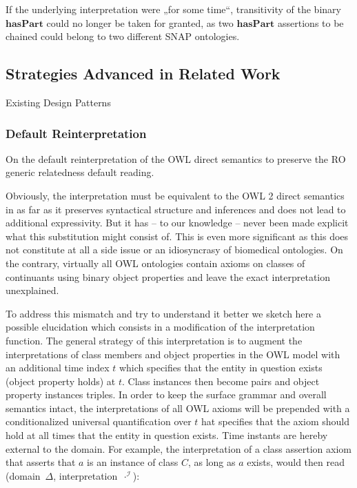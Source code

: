 \documentclass[10pt]{bmc_article}
\newcommand{\mirel}[1]{\ensuremath{\mathrm{\mathbf{#1}}}}
\newcommand{\mclass}[1]{\ensuremath{\mathit{#1}}}
\newenvironment{bmcformat}{\baselineskip20pt\sloppy\setboolean{publ}{false}}{\baselineskip20pt\sloppy}
\begin{document}
\begin{bmcformat}
If the underlying interpretation were „for some time“, transitivity of the
binary \mirel{hasPart} could no longer be taken for granted, as two
\mirel{hasPart} assertions to be chained could belong to two different SNAP
ontologies.

\subsection*{Strategies Advanced in Related Work}
Existing Design Patterns

\subsubsection*{Default Reinterpretation}

On the default reinterpretation of the OWL direct semantics to preserve the RO 
generic relatedness default reading. 

Obviously, the interpretation must be equivalent to the OWL 2 direct semantics
\cite{OWL2:direct} in as far as it preserves syntactical structure and inferences and does not
lead to additional expressivity. But it has – to our knowledge – never been made
explicit what this substitution might consist of.  This is even more significant
as this does not constitute at all a side issue or an idiosyncrasy of biomedical
ontologies. On the contrary, virtually all OWL ontologies contain axioms on
classes of continuants using binary object properties and leave the exact
interpretation unexplained. 

To address this mismatch and try to understand it better we sketch here a
possible elucidation  which consists in a modification of the interpretation
function. The general strategy of this interpretation is to augment the
interpretations of class members and object properties in the OWL model with an
additional time index $t$ which specifies that the entity in question exists
(object property holds) at $t$. Class instances then become pairs and object
property instances triples. In order to keep the surface grammar and overall
semantics intact, the interpretations of all OWL axioms will be prepended with a
conditionalized universal quantification over $t$  hat specifies that the axiom
should hold at all times that the entity in question exists.  Time instants are
hereby external to the domain. For example, the interpretation of a class
assertion axiom that asserts that $a$ is an instance of class \mclass{C}, as long
as $a$ exists, would then read (domain~$\Delta$, interpretation~$\cdot^\mathcal{I}$):


\end{bmcformat}
\end{document}

